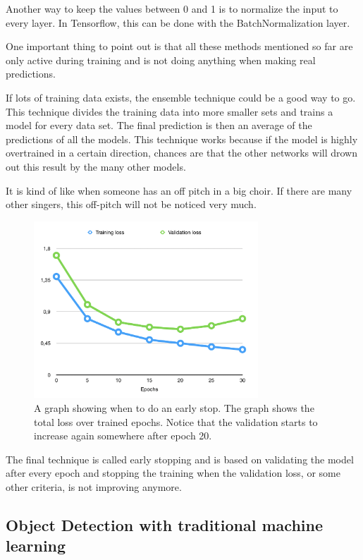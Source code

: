Another way to keep the values between 0 and 1 is to normalize the input to every layer. In Tensorflow, this can be done with the BatchNormalization layer.

One important thing to point out is that all these methods mentioned so far are only active during training and is not doing anything when making real predictions.


If lots of training data exists, the ensemble technique could be a good way to go. This technique divides the training data into more smaller sets and trains a model for every data set.
The final prediction is then an average of the predictions of all the models. This technique works because if the model is highly overtrained in a certain direction, chances are that the other networks will drown out this result by the many other models.

It is kind of like when someone has an off pitch in a big choir. If there are many other singers, this off-pitch will not be noticed very much.

\begin{figure}[hbtp]
\begin{center}
\includegraphics[width = 0.75\textwidth]{./Images/early_stop.jpg} 
\caption{A graph showing when to do an early stop. The graph shows the total loss over trained epochs. Notice that the validation starts to increase again somewhere after epoch 20.}
\end{center}
\end{figure}

The final technique is called early stopping and is based on validating the model after every epoch and stopping the training when the validation loss, or some other criteria, is not improving anymore.

\subsection{Object Detection with traditional machine learning}

